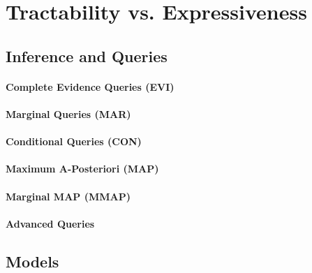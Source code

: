 	\section{Tractability vs. Expressiveness} %

		\subsection{Inference and Queries} %

			\paragraph{Complete Evidence Queries (EVI)} %

			\paragraph{Marginal Queries (MAR)} %

			\paragraph{Conditional Queries (CON)} %

			\paragraph{Maximum A-Posteriori (MAP)} %

			\paragraph{Marginal MAP (MMAP)} %

			\paragraph{Advanced Queries} %

		\subsection{Models} %

